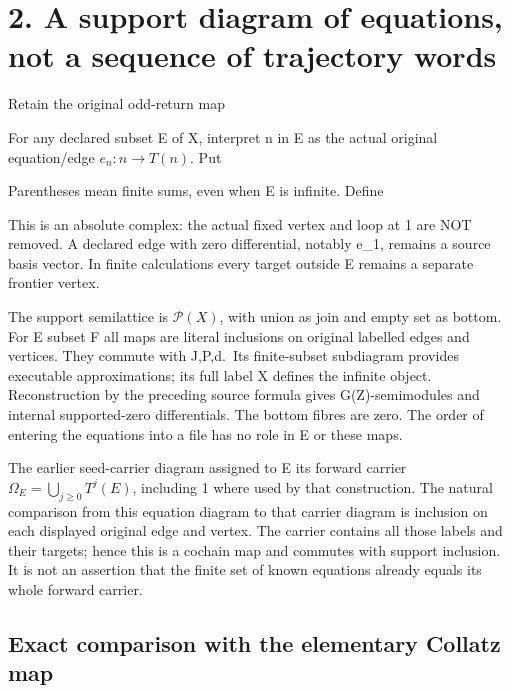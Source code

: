 \section{2. A support diagram of equations, not a sequence of trajectory
words}

Retain the original odd-return map


For any declared subset E of X, interpret n in E as the actual original
equation/edge \(e_n:n\to T(n)\). Put


Parentheses mean finite sums, even when E is infinite. Define


This is an absolute complex: the actual fixed vertex and loop at 1 are
NOT removed. A declared edge with zero differential, notably e\_1,
remains a source basis vector. In finite calculations every target
outside E remains a separate frontier vertex.

The support semilattice is \(\mathcal P(X)\), with union as join and
empty set as bottom. For E subset F all maps are literal inclusions on
original labelled edges and vertices. They commute with J,P,d.~Its
finite-subset subdiagram provides executable approximations; its full
label X defines the infinite object. Reconstruction by the preceding
source formula gives G(Z)-semimodules and internal supported-zero
differentials. The bottom fibres are zero. The order of entering the
equations into a file has no role in E or these maps.

The earlier seed-carrier diagram assigned to E its forward carrier
\(\Omega_E=\bigcup_{j\ge0}T^j(E)\), including 1 where used by that
construction. The natural comparison from this equation diagram to that
carrier diagram is inclusion on each displayed original edge and vertex.
The carrier contains all those labels and their targets; hence this is a
cochain map and commutes with support inclusion. It is not an assertion
that the finite set of known equations already equals its whole forward
carrier.

\subsection{Exact comparison with the elementary Collatz map}

